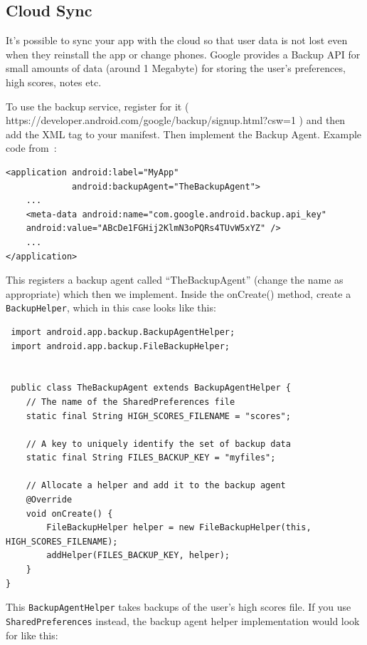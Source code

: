 \cite{android:network2}

\subsection*{Cloud Sync}
It's possible to sync your app with the cloud so that user data is not lost even when they reinstall the app or change phones. Google provides a Backup API for small amounts of data (around 1 Megabyte) for storing the user's preferences, high scores, notes etc.

To use the backup service, register for it ( https://developer.android.com/google/backup/signup.html?csw=1 ) and then add the XML tag to your manifest. Then implement the Backup Agent. Example code from~\cite{android:cloudsync}:

\begin{verbatim}
<application android:label="MyApp"
             android:backupAgent="TheBackupAgent">
    ...
    <meta-data android:name="com.google.android.backup.api_key"
    android:value="ABcDe1FGHij2KlmN3oPQRs4TUvW5xYZ" />
    ...
</application>
\end{verbatim}

This registers a backup agent called ``TheBackupAgent'' (change the name as appropriate) which then we implement. Inside the onCreate() method, create a \texttt{BackupHelper}, which in this case looks like this:

\begin{verbatim}
 import android.app.backup.BackupAgentHelper;
 import android.app.backup.FileBackupHelper;


 public class TheBackupAgent extends BackupAgentHelper {
    // The name of the SharedPreferences file
    static final String HIGH_SCORES_FILENAME = "scores";

    // A key to uniquely identify the set of backup data
    static final String FILES_BACKUP_KEY = "myfiles";

    // Allocate a helper and add it to the backup agent
    @Override
    void onCreate() {
        FileBackupHelper helper = new FileBackupHelper(this, HIGH_SCORES_FILENAME);
        addHelper(FILES_BACKUP_KEY, helper);
    }
}
\end{verbatim}

This \texttt{BackupAgentHelper} takes backups of the user's high scores file. If you use \texttt{SharedPreferences} instead, the backup agent helper implementation would look for like this:

